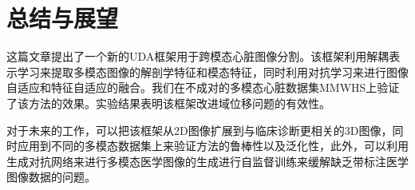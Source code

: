 \chapter{总结与展望}

\label{cha:conclusion}

这篇文章提出了一个新的UDA框架用于跨模态心脏图像分割。该框架利用解耦表示学习来提取多模态图像的解剖学特征和模态特征，同时利用对抗学习来进行图像自适应和特征自适应的融合。我们在不成对的多模态心脏数据集MMWHS上验证了该方法的效果。实验结果表明该框架改进域位移问题的有效性。

对于未来的工作，可以把该框架从2D图像扩展到与临床诊断更相关的3D图像，同时应用到不同的多模态数据集上来验证方法的鲁棒性以及泛化性，此外，可以利用生成对抗网络来进行多模态医学图像的生成进行自监督训练来缓解缺乏带标注医学图像数据的问题。
